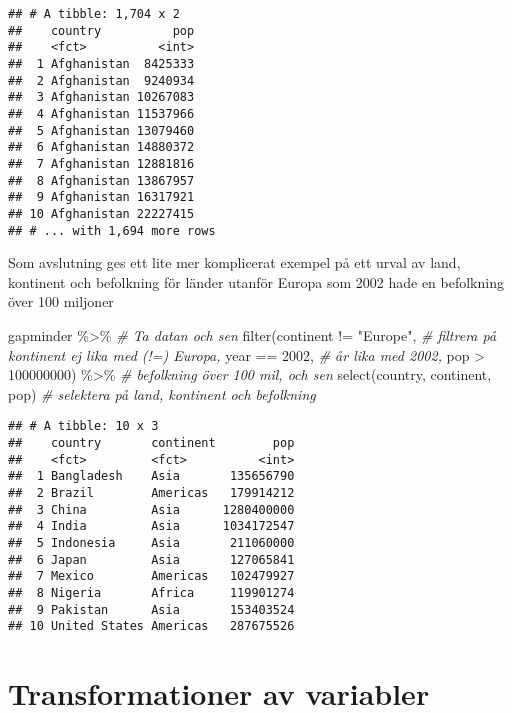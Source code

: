 \documentclass[
]{book}
\newenvironment{Shaded}{\begin{snugshade}}{\end{snugshade}}
\newcommand{\CommentTok}[1]{\textcolor[rgb]{0.56,0.35,0.01}{\textit{#1}}}
\newcommand{\DecValTok}[1]{\textcolor[rgb]{0.00,0.00,0.81}{#1}}
\newcommand{\FunctionTok}[1]{\textcolor[rgb]{0.00,0.00,0.00}{#1}}
\newcommand{\NormalTok}[1]{#1}
\newcommand{\SpecialCharTok}[1]{\textcolor[rgb]{0.00,0.00,0.00}{#1}}
\newcommand{\StringTok}[1]{\textcolor[rgb]{0.31,0.60,0.02}{#1}}
\theoremstyle{definition}
\theoremstyle{definition}
\theoremstyle{definition}
\theoremstyle{definition}
\theoremstyle{remark}
\begin{document}
\begin{verbatim}
## # A tibble: 1,704 x 2
##    country          pop
##    <fct>          <int>
##  1 Afghanistan  8425333
##  2 Afghanistan  9240934
##  3 Afghanistan 10267083
##  4 Afghanistan 11537966
##  5 Afghanistan 13079460
##  6 Afghanistan 14880372
##  7 Afghanistan 12881816
##  8 Afghanistan 13867957
##  9 Afghanistan 16317921
## 10 Afghanistan 22227415
## # ... with 1,694 more rows
\end{verbatim}

Som avslutning ges ett lite mer komplicerat exempel på ett urval av land, kontinent och befolkning för länder utanför Europa som 2002 hade en befolkning över 100 miljoner

\begin{Shaded}
\begin{Highlighting}[]
\NormalTok{gapminder }\SpecialCharTok{\%\textgreater{}\%}                     \CommentTok{\# Ta datan och sen}
  \FunctionTok{filter}\NormalTok{(continent }\SpecialCharTok{!=} \StringTok{"Europe"}\NormalTok{,   }\CommentTok{\# filtrera på kontinent ej lika med (!=) Europa,}
\NormalTok{         year }\SpecialCharTok{==} \DecValTok{2002}\NormalTok{,            }\CommentTok{\# år lika med 2002,}
\NormalTok{         pop }\SpecialCharTok{\textgreater{}} \DecValTok{100000000}\NormalTok{) }\SpecialCharTok{\%\textgreater{}\%}     \CommentTok{\# befolkning över 100 mil, och sen}
  \FunctionTok{select}\NormalTok{(country, continent, pop) }\CommentTok{\# selektera på land, kontinent och befolkning}
\end{Highlighting}
\end{Shaded}

\begin{verbatim}
## # A tibble: 10 x 3
##    country       continent        pop
##    <fct>         <fct>          <int>
##  1 Bangladesh    Asia       135656790
##  2 Brazil        Americas   179914212
##  3 China         Asia      1280400000
##  4 India         Asia      1034172547
##  5 Indonesia     Asia       211060000
##  6 Japan         Asia       127065841
##  7 Mexico        Americas   102479927
##  8 Nigeria       Africa     119901274
##  9 Pakistan      Asia       153403524
## 10 United States Americas   287675526
\end{verbatim}

\hypertarget{transformationer-av-variabler}{%
\section{Transformationer av variabler}\label{transformationer-av-variabler}}
\end{document}
